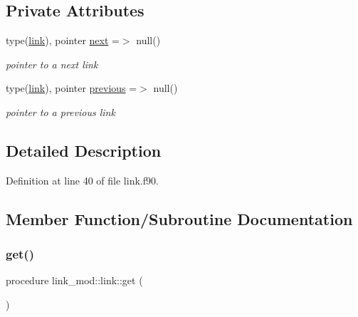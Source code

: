 \subsection*{Private Attributes}
\begin{DoxyCompactItemize}
\item 
type(\mbox{\hyperlink{structlink__mod_1_1link}{link}}), pointer \mbox{\hyperlink{structlink__mod_1_1link_ab98cf41b8ed6245972f95aae4667b249}{next}} =$>$ null()
\begin{DoxyCompactList}\small\item\em pointer to a next link \end{DoxyCompactList}\item 
type(\mbox{\hyperlink{structlink__mod_1_1link}{link}}), pointer \mbox{\hyperlink{structlink__mod_1_1link_ae85bee976bd1eff62006c9a89732da13}{previous}} =$>$ null()
\begin{DoxyCompactList}\small\item\em pointer to a previous link \end{DoxyCompactList}\end{DoxyCompactItemize}


\subsection{Detailed Description}


Definition at line 40 of file link.\+f90.



\subsection{Member Function/\+Subroutine Documentation}
\mbox{\label{structlink__mod_1_1link_ae93e1e4945ec20b860a1395707f5a3c2}} 
\subsubsection{\texorpdfstring{get()}{get()}}
{\footnotesize\ttfamily procedure link\+\_\+mod\+::link\+::get (\begin{DoxyParamCaption}{ }\end{DoxyParamCaption})\hspace{0.3cm}{\ttfamily [private]}}



